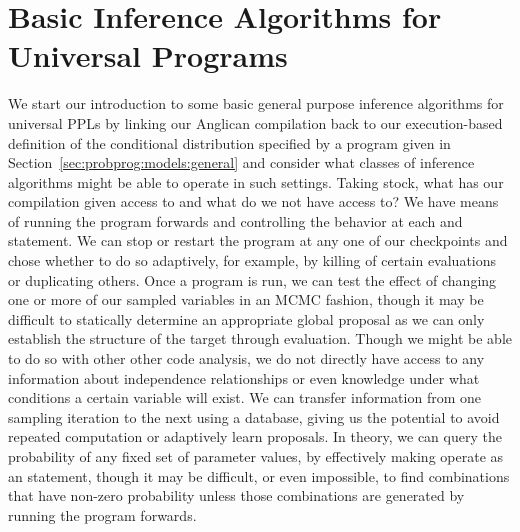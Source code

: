 
\section{Basic Inference Algorithms for Universal Programs}
\label{sec:proginf:inf}

We start our introduction to some basic general purpose inference algorithms for
universal PPLs by linking our Anglican compilation back to our execution-based 
definition of the conditional distribution specified by a program given in 
Section~\ref{sec:probprog:models:general} and consider what classes of inference
algorithms might be able to operate in such settings.  Taking stock, what has our compilation
given access to and what do we not have access to?  We have means of running the program
forwards and controlling the behavior at each \sample and \observe statement.  We can
stop or restart the program at any one of our checkpoints and chose whether to do so
adaptively, for example, by killing of certain evaluations or duplicating others.  Once
a program is run, we can test the effect of changing one or more of our sampled variables
in an MCMC fashion, though it may be difficult to statically determine an appropriate global proposal
as we can only establish the structure of the target through evaluation.  Though we might be
able to do so with other other code analysis, we do not directly have access to any information
about independence relationships or even knowledge under what conditions a certain
variable will exist.  We can transfer information from one sampling iteration to the next
using a database, giving us the potential to avoid repeated computation or adaptively learn proposals.
In theory, we can query the probability of any fixed set of parameter values, by effectively making
\sample operate as an \observe statement, though it may be difficult, or even impossible, to find
combinations that have non-zero probability unless those combinations are generated by running
the program forwards.
